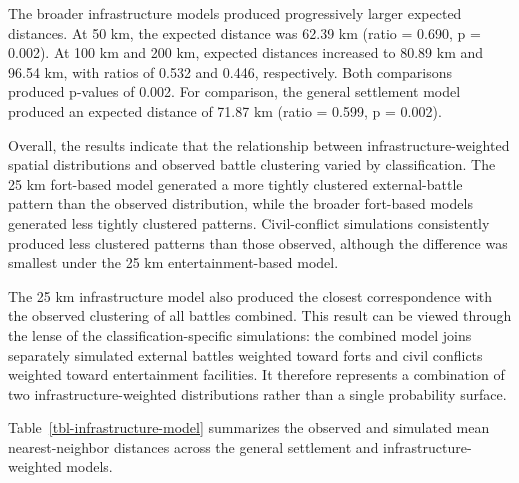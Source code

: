 \documentclass[
  letterpaper,
  DIV=11,
  numbers=noendperiod]{scrartcl}
\begin{document}
The broader infrastructure models produced progressively larger expected
distances. At 50 km, the expected distance was 62.39 km (ratio = 0.690,
p = 0.002). At 100 km and 200 km, expected distances increased to 80.89
km and 96.54 km, with ratios of 0.532 and 0.446, respectively. Both
comparisons produced p-values of 0.002. For comparison, the general
settlement model produced an expected distance of 71.87 km (ratio =
0.599, p = 0.002).

Overall, the results indicate that the relationship between
infrastructure-weighted spatial distributions and observed battle
clustering varied by classification. The 25 km fort-based model
generated a more tightly clustered external-battle pattern than the
observed distribution, while the broader fort-based models generated
less tightly clustered patterns. Civil-conflict simulations consistently
produced less clustered patterns than those observed, although the
difference was smallest under the 25 km entertainment-based model.

The 25 km infrastructure model also produced the closest correspondence
with the observed clustering of all battles combined. This result can be
viewed through the lense of the classification-specific simulations: the
combined model joins separately simulated external battles weighted
toward forts and civil conflicts weighted toward entertainment
facilities. It therefore represents a combination of two
infrastructure-weighted distributions rather than a single probability
surface.

Table~\ref{tbl-infrastructure-model} summarizes the observed and
simulated mean nearest-neighbor distances across the general settlement
and infrastructure-weighted models.
\end{document}
